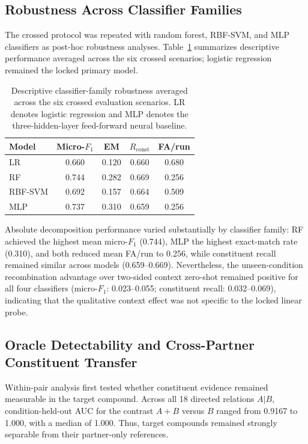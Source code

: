 \documentclass{ieeeaccess}
\begin{document}
\subsection{Robustness Across Classifier Families}
\label{subsec:classifier_robustness_results}

The crossed protocol was repeated with random forest, RBF-SVM, and MLP
classifiers as post-hoc robustness analyses. Table~\ref{tab:model_robustness}
summarizes descriptive performance averaged across the six crossed scenarios;
logistic regression remained the locked primary model.

\begin{table}[t]
\caption{Descriptive classifier-family robustness averaged across the six
crossed evaluation scenarios. LR denotes logistic regression and MLP denotes
the three-hidden-layer feed-forward neural baseline.}
\label{tab:model_robustness}
\centering
\footnotesize
\begin{tabular}{lcccc}
\toprule
Model &
Micro-$F_1$ &
EM &
$R_{\mathrm{const}}$ &
FA/run \\
\midrule
LR      & 0.660 & 0.120 & 0.660 & 0.680 \\
RF      & 0.744 & 0.282 & 0.669 & 0.256 \\
RBF-SVM & 0.692 & 0.157 & 0.664 & 0.509 \\
MLP     & 0.737 & 0.310 & 0.659 & 0.256 \\
\bottomrule
\end{tabular}
\end{table}

Absolute decomposition performance varied substantially by classifier family:
RF achieved the highest mean micro-$F_1$ (0.744), MLP the highest exact-match
rate (0.310), and both reduced mean FA/run to 0.256, while constituent recall
remained similar across models (0.659--0.669). Nevertheless, the
unseen-condition recombination advantage over two-sided context zero-shot
remained positive for all four classifiers
(micro-$F_1$: 0.023--0.055; constituent recall: 0.032--0.069), indicating
that the qualitative context effect was not specific to the locked linear probe.

\subsection{Oracle Detectability and Cross-Partner Constituent Transfer}
\label{subsec:oracle_transfer_results}

Within-pair analysis first tested whether constituent evidence remained
measurable in the target compound. Across all 18 directed relations $A|B$,
condition-held-out AUC for the contrast $A+B$ versus $B$ ranged from 0.9167
to 1.000, with a median of 1.000. Thus, target compounds remained strongly
separable from their partner-only references.
\end{document}
